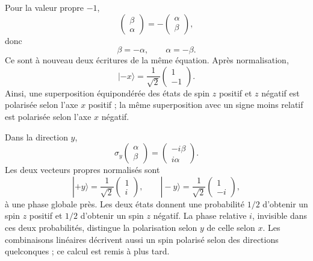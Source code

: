 Pour la valeur propre \(-1\),
\begin{equation}
\begin{pmatrix}
\beta\\
\alpha
\end{pmatrix}
=
-
\begin{pmatrix}
\alpha\\
\beta
\end{pmatrix},
\end{equation}
donc
\begin{equation}
\beta=-\alpha,
\qquad
\alpha=-\beta.
\end{equation}
Ce sont à nouveau deux écritures de la même équation. Après normalisation,
\begin{equation}
|-x\rangle
=
\frac{1}{\sqrt2}
\begin{pmatrix}
1\\
-1
\end{pmatrix}.
\end{equation}
Ainsi, une superposition équipondérée des états de spin \(z\) positif et \(z\) négatif est polarisée selon l’axe \(x\) positif ; la même superposition avec un signe moins relatif est polarisée selon l’axe \(x\) négatif.

Dans la direction \(y\),
\begin{equation}
\sigma_y
\begin{pmatrix}
\alpha\\
\beta
\end{pmatrix}
=
\begin{pmatrix}
-i\beta\\
i\alpha
\end{pmatrix}.
\end{equation}
Les deux vecteurs propres normalisés sont
\begin{equation}
|+y\rangle
=
\frac{1}{\sqrt2}
\begin{pmatrix}
1\\
i
\end{pmatrix},
\qquad
|-y\rangle
=
\frac{1}{\sqrt2}
\begin{pmatrix}
1\\
-i
\end{pmatrix},
\end{equation}
à une phase globale près. Les deux états donnent une probabilité \(1/2\) d’obtenir un spin \(z\) positif et \(1/2\) d’obtenir un spin \(z\) négatif. La phase relative \(i\), invisible dans ces deux probabilités, distingue la polarisation selon \(y\) de celle selon \(x\). Les combinaisons linéaires décrivent aussi un spin polarisé selon des directions quelconques ; ce calcul est remis à plus tard.

